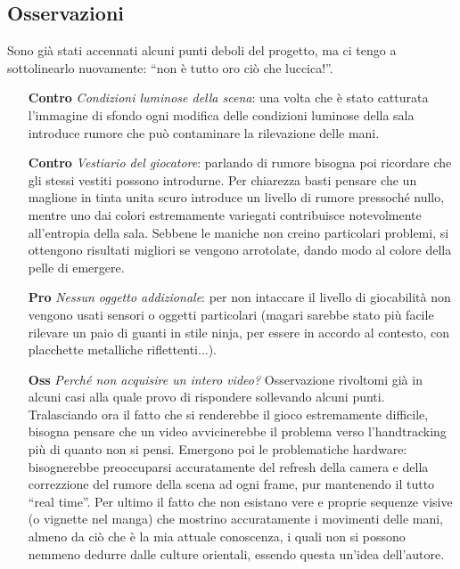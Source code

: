 \documentclass[a4paper,10pt, twocolumn]{article}
\begin{document}
  \subsection*{Osservazioni}
  Sono gi\`{a} stati accennati alcuni punti deboli del progetto, ma ci tengo 
  a sottolinearlo nuovamente: ``non \`{e} tutto oro ci\`{o} che luccica!''.
  \begin{enumerate}
   \item[\textbf{Contro}] \textsl{Condizioni luminose della scena}: una volta che \`{e} stato
catturata
   l'immagine di sfondo ogni modifica delle condizioni luminose della sala
   introduce rumore che pu\`{o} contaminare la rilevazione delle mani.
   \item[\textbf{Contro}] \textsl{Vestiario del giocatore}: parlando di rumore
   bisogna poi ricordare che gli stessi vestiti possono introdurne. 
   Per chiarezza basti pensare che un maglione in tinta unita scuro introduce
   un livello di rumore pressoch\'{e} nullo, mentre uno dai colori estremamente variegati
   contribuisce notevolmente all'entropia della sala. Sebbene le maniche
   non creino particolari problemi, si ottengono risultati migliori se vengono 
   arrotolate, dando modo al colore della pelle di emergere.
   \item[\textbf{Pro}] \textsl{Nessun oggetto addizionale}: per non intaccare
   il livello di giocabilit\`{a} non vengono usati sensori o oggetti particolari
   (magari sarebbe stato pi\`{u} facile rilevare un paio di guanti
   in stile ninja, per essere in accordo al contesto,
   con placchette metalliche riflettenti...).
   \item[\textbf{Oss}] \textsl{Perch\'{e} non acquisire un intero video?}
   Osservazione rivoltomi gi\`{a} in alcuni casi alla quale provo di rispondere
   sollevando alcuni punti. Tralasciando ora il fatto che si renderebbe il 
   gioco estremamente difficile, bisogna pensare che un video avvicinerebbe
   il problema verso l'handtracking
   pi\`{u} di quanto non si pensi. Emergono poi le problematiche hardware: 
   bisognerebbe preoccuparsi accuratamente del refresh della camera e 
   della correzzione del rumore della scena ad ogni frame, pur mantenendo
   il tutto ``real time''. Per ultimo il fatto che non esistano vere e proprie 
   sequenze visive (o vignette nel manga)
   che mostrino accuratamente i movimenti delle mani, almeno da 
   ci\`{o} che \`{e} la mia attuale conoscenza,
   i quali non si possono
   nemmeno dedurre dalle culture orientali, essendo questa un'idea dell'autore.
  \end{enumerate}
\end{document}
